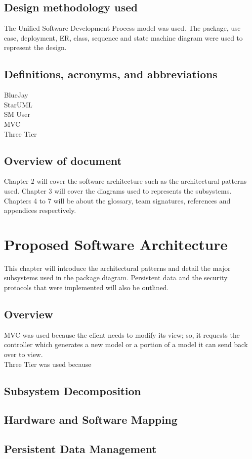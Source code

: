 \documentclass{report}
\begin{document}
\section{Design methodology used} 
	The Unified Software Development Process model was used. The package, use case, deployment, ER, class, sequence and state machine diagram were used to represent the design.
\section{Definitions, acronyms, and abbreviations}
BlueJay\\StarUML\\SM User\\MVC\\Three Tier
\section{Overview of document}
		Chapter 2 will cover the software architecture such as the architectural patterns used. Chapter 3 will cover the diagrams used to represents the subsystems. Chapters 4 to 7 will be about the glossary, team signatures, references and appendices respectively.
\chapter{Proposed Software Architecture}
	This chapter will introduce the architectural patterns and detail the major subsystems used in the package diagram. Persistent data and the security protocols that were implemented will also be outlined.
\section{Overview}
	MVC was used because the client needs to modify its view; so, it requests the controller which generates a new model or a portion of a model it can send back over to view.\\
	Three Tier was used because
\section{Subsystem Decomposition}
\section{Hardware and Software Mapping}
\section{Persistent Data Management}
\end{document}
